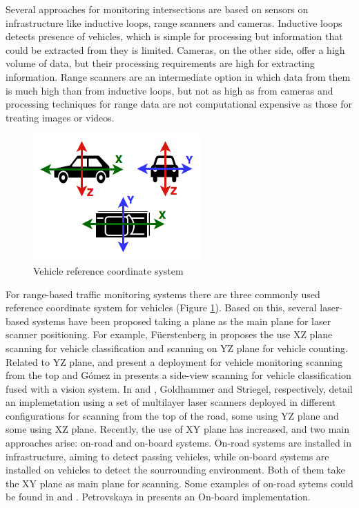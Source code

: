 \documentclass[10pt,twocolumn,letterpaper]{article}
\begin{document}
Several approaches for monitoring intersections are based on sensors on infrastructure like inductive loops, range scanners and cameras. Inductive loops detects presence of vehicles, which is simple for processing but information that could be extracted from they is limited. Cameras, on the other side, offer a high volume of data, but their processing requirements are high for extracting information. Range scanners are an intermediate option in which data from them is much high than from inductive loops, but not as high as from cameras and processing techniques for range data are not computational expensive as those for treating images or videos.

\begin{figure}[ht!]
\centering
\includegraphics[scale=0.8]{fig/carReferenceSystem.png}
\caption{Vehicle reference coordinate system}
\label{vehicle_cs}
\end{figure}

For range-based traffic monitoring systems there are three commonly used reference coordinate system for vehicles (Figure \ref{vehicle_cs}). Based on this, several laser-based systems have been proposed taking a plane as the main plane for laser scanner positioning. For example, F{\"u}erstenberg in  \cite{Fuerstenberg2000} proposes the use XZ plane scanning for vehicle classification and scanning on YZ plane for vehicle counting. Related to YZ plane, \cite{Harlow2001} and \cite{Vivet2013} present a deployment for vehicle monitoring scanning from the top and Gómez in \cite{Gomez2013} presents a side-view scanning for vehicle classification fused with a vision system. In \cite{Goldhammer2012} and \cite{Strigel2014}, Goldhammer and Striegel, respectively, detail an implemetation using a set of multilayer laser scanners deployed in different configurations for scanning from the top of the road, some using YZ plane and some using XZ plane. Recently, the use of XY plane has increased, and two main approaches arise: on-road and on-board systems. On-road systems are installed in infrastructure, aiming to detect passing vehicles, while on-board systems are installed on vehicles to detect the sourrounding environment. Both of them take the XY plane as main plane for scanning. Some examples of on-road sytems could be found in \cite{Zhao2006, Zhao2008, Zhao2009, Zhao2012} and \cite{Perng2014}. Petrovskaya in \cite{Petrovskaya2009} presents an On-board implementation.
\end{document}
